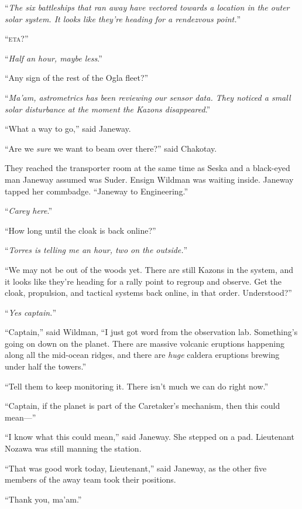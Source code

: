 \documentclass[twoside,letterpaper,12pt]{memoir}
\begin{document}
``\textit{The six battleships that ran away have vectored towards a location in the outer solar system. It looks like they're heading for a rendezvous point.}'' 

``\textsc{eta}?'' 

``\textit{Half an hour, maybe less}.'' 

``Any sign of the rest of the Ogla fleet?'' 

``\textit{Ma'am, astrometrics has been reviewing our sensor data. They noticed a small solar disturbance at the moment the Kazons disappeared}.'' 

``What a way to go,'' said Janeway. 

``Are we \textit{sure} we want to beam over there?'' said Chakotay. 

They reached the transporter room at the same time as Seska and a black-eyed man Janeway assumed was Suder. Ensign Wildman was waiting inside. Janeway tapped her commbadge. ``Janeway to Engineering.'' 

``\textit{Carey here}.'' 

``How long until the cloak is back online?'' 

``\textit{Torres is telling me an hour, two on the outside.}'' 

``We may not be out of the woods yet. There are still Kazons in the system, and it looks like they're heading for a rally point to regroup and observe. Get the cloak, propulsion, and tactical systems back online, in that order. Understood?'' 

``\textit{Yes captain.}'' 

``Captain,'' said Wildman, ``I just got word from the observation lab. Something's going on down on the planet. There are massive volcanic eruptions happening along all the mid-ocean ridges, and there are \textit{huge} caldera eruptions brewing under half the towers.'' 

``Tell them to keep monitoring it. There isn't much we can do right now.'' 

``Captain, if the planet is part of the Caretaker's mechanism, then this could mean---'' 

``I know what this could mean,'' said Janeway. She stepped on a pad. Lieutenant Nozawa was still manning the station. 

``That was good work today, Lieutenant,'' said Janeway, as the other five members of the away team took their positions. 

``Thank you, ma'am.'' 
\end{document}
